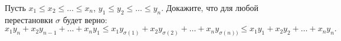 Пусть $x_1 \le x_2 \le \dots \le x_n$, $y_1 \le y_2 \le \dots \le y_n$. Докажите, что для любой
перестановки $\sigma$ будет верно:
$$
    x_1 y_n + x_2 y_{n - 1} + \dots +  x_n y_1 \le x_1 y_{\sigma(1)} + x_2 y_{\sigma(2)} + \dots + x_n
    y_{\sigma(n))} \le x_1 y_1 + x_2 y_2 + \dots + x_n y_n.
$$